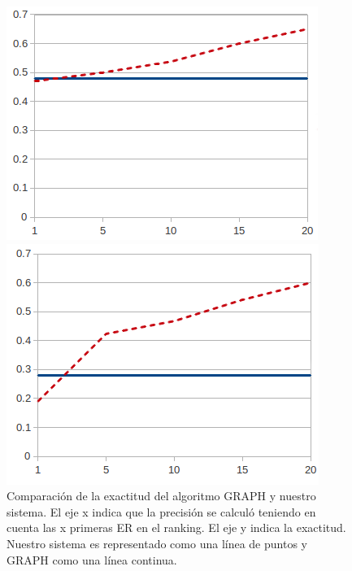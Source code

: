 \begin{figure}[ht]
\begin{minipage}{0.50\linewidth}
\centering
\includegraphics[width=\textwidth]{images/furniturePrec.png}
\end{minipage}
\begin{minipage}{0.50\linewidth}
\centering
\includegraphics[width=\textwidth]{images/precP.png}
\end{minipage}
\caption{Comparaci\'on de la exactitud del algoritmo GRAPH y nuestro sistema. El eje x indica que la precisi\'on se calcul\'o teniendo en cuenta las x primeras ER en el ranking. El eje y indica la exactitud. Nuestro sistema es representado como una l\'inea de puntos y GRAPH como una l\'inea continua.\label{graficoPresicion}}
\end{figure}


